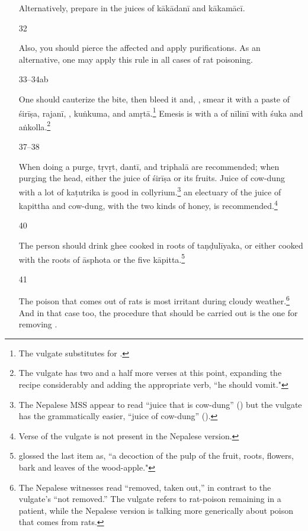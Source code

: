 \begin{translation}
\begin{itemize}
Alternatively, prepare in the juices of \gls{kākādanī} and \gls{kākamācī}.



\item[32]

Also, you should pierce the affected  and apply purifications.
As an alternative, one may apply this rule in all cases of rat poisoning.

\item[33--34ab]

One should cauterize the bite, then bleed it and,
, smear it with a paste of
\gls{śirīṣa}, \gls{rajanī}, , \gls{kuṅkuma}, and
\gls{amṛtā}.\footnote{The vulgate substitutes  for
    .} Emesis is with a  of \gls{nīlinī}
    with \gls{śuka} and \gls{aṅkolla}.\footnote{The vulgate has two and a
        half more verses at this point, expanding the recipe considerably and
        adding the appropriate verb, “he should vomit."}

\item[37--38]

When doing a purge, \gls{tṛvṛt}, \gls{dantī}, and \gls{triphalā} are
recommended;  when purging the head, either the juice of \gls{śirīṣa}
or its fruits. Juice of cow-dung with a lot of \gls{kaṭutrika} is
good in collyrium.\footnote{The Nepalese MSS appear to read “juice
    that is cow-dung” () but the vulgate has the
    grammatically easier, “juice of cow-dung” ().} an
    electuary of the juice of \gls{kapittha} and cow-dung, with the two
    kinds of honey, is recommended.\footnote{Verse  of
        the vulgate is not present in the Nepalese version.}

\item[40]

The person should drink ghee cooked in roots of \gls{taṇḍulīyaka}, or
either cooked with the roots of \gls{āsphota} or the five
\gls{kāpitta}.\footnote{ glossed the last item
    as, “a decoction of the pulp of the fruit, roots, flowers, bark and leaves
    of the wood-apple."}

\item[41]

The poison that comes out of rats is most irritant during cloudy
weather.\footnote{The Nepalese witnesses read 
    “removed, taken out,” in contrast to the vulgate's 
    “not removed.”  The vulgate refers to rat-poison remaining in a
    patient, while the Nepalese version is talking more generically about
    poison that comes from rats.} And in that case too, the procedure
    that should be carried out is the one for removing
    .
    

\end{itemize}
\end{translation}
